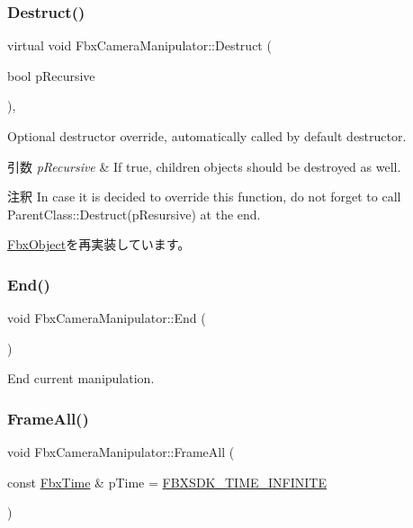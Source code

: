 \subsubsection{\texorpdfstring{Destruct()}{Destruct()}}
{\footnotesize\ttfamily virtual void Fbx\+Camera\+Manipulator\+::\+Destruct (\begin{DoxyParamCaption}\item[{bool}]{p\+Recursive }\end{DoxyParamCaption})\hspace{0.3cm}{\ttfamily [protected]}, {\ttfamily [virtual]}}

Optional destructor override, automatically called by default destructor. 
\begin{DoxyParams}{引数}
{\em p\+Recursive} & If true, children objects should be destroyed as well. \\
\hline
\end{DoxyParams}
\begin{DoxyRemark}{注釈}
In case it is decided to override this function, do not forget to call Parent\+Class\+::\+Destruct(p\+Resursive) at the end. 
\end{DoxyRemark}


\hyperlink{class_fbx_object_a123e084d9b32b29c28af6384b7c3c608}{Fbx\+Object}を再実装しています。

\mbox{\label{class_fbx_camera_manipulator_ae9eef6e3b92ce1b9f2a7da21a2487bb2}} 
\subsubsection{\texorpdfstring{End()}{End()}}
{\footnotesize\ttfamily void Fbx\+Camera\+Manipulator\+::\+End (\begin{DoxyParamCaption}{ }\end{DoxyParamCaption})}



End current manipulation. 

\mbox{\label{class_fbx_camera_manipulator_a78fab2478759b295c01ab4a4e5f716e9}} 
\subsubsection{\texorpdfstring{Frame\+All()}{FrameAll()}}
{\footnotesize\ttfamily void Fbx\+Camera\+Manipulator\+::\+Frame\+All (\begin{DoxyParamCaption}\item[{const \hyperlink{class_fbx_time}{Fbx\+Time} \&}]{p\+Time = {\ttfamily \hyperlink{fbxtime_8h_a1e6db3fe0f84f0b7daa775739f93526f}{F\+B\+X\+S\+D\+K\+\_\+\+T\+I\+M\+E\+\_\+\+I\+N\+F\+I\+N\+I\+TE}} }\end{DoxyParamCaption})}


